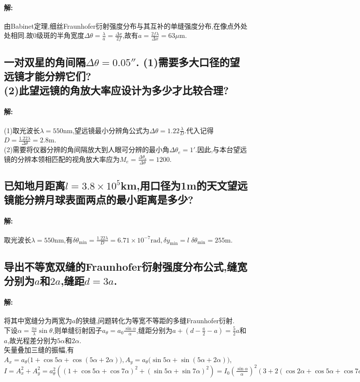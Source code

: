 \documentclass[UTF8]{article}
\newcommand{\m}{\mathrm{m}}
\newcommand{\nm}{\mathrm{nm}}
\begin{document}
    \paragraph{解: }由Babinet定理,细丝Fraunhofer衍射强度分布与其互补的单缝强度分布,在像点外处处相同.故0级斑的半角宽度$\Delta \theta=\frac{\lambda}{a}=\frac{\Delta x}{2f}$,故有$a=\frac{2f\lambda}{\Delta x}=63\mu \m$.

    \subsection{一对双星的角间隔$\Delta \theta=0.05''$. (1)需要多大口径的望远镜才能分辨它们?\\ (2)此望远镜的角放大率应设计为多少才比较合理?} %
    \paragraph{解: }(1)取光波长$\lambda=550\nm$,望远镜最小分辨角公式为$\Delta \theta=1.22\frac{\lambda}{D}$.代入记得$D=\frac{1.22\lambda}{\Delta \theta}=2.8\m$.\\ (2)需要将仪器分辨的角间隔放大到人眼可分辨的最小角$\Delta \theta_e=1'$.因此,与本台望远镜的分辨本领相匹配的视角放大率应为$M_e=\frac{\Delta \theta_e}{\Delta \theta}=1200$.

    \setcounter{subsection}{18}
    \subsection{已知地月距离$l=3.8\times 10^5$km,用口径为1m的天文望远镜能分辨月球表面两点的最小距离是多少?
    } %
    \paragraph{解: }取光波长$\lambda=550\nm$,有$\delta \theta_{\mathrm{min}}=\frac{1.22\lambda}{D}=6.71\times 10^{-7}\mathrm{rad},\delta y_{\mathrm{min}}=l\; \delta \theta_{\mathrm{min}}=255\m$.

    \setcounter{subsection}{25}
    \subsection{导出不等宽双缝的Fraunhofer衍射强度分布公式,缝宽分别为$a$和$2a$,缝距$d=3a$.} %
    \paragraph{解: }将其中宽缝分为两宽为$a$的狭缝,问题转化为等宽不等距的多缝Fraunhofer衍射.\\ 下设$\alpha=\frac{\pi a}{\lambda}\sin \theta$,则单缝衍射因子$a_\theta=a_0\frac{\sin \alpha}{\alpha}$,缝距分别为$a+\left( d-\frac{a}{2}-a \right)=\frac{5}{2}a$和$a$,故光程差分别为$5\alpha$和$2\alpha$.\\ 
    矢量叠加三缝的振幅,有$A_x=a_\theta \big( 1+\cos 5\alpha+\cos (5\alpha+2\alpha) \big),A_y=a_\theta \big( \sin 5\alpha+\sin (5\alpha+2\alpha) \big)$,\\ $I=A^2_x+A^2_y=a_\theta^2\left( \left( 1+\cos 5\alpha+\cos 7\alpha \right)^2+\left( \sin 5\alpha+\sin 7\alpha \right)^2 \right)=I_0\left( \frac{\sin \alpha}{\alpha} \right)^2\left( 3+2\left( \cos 2\alpha+\cos 5\alpha+\cos 7\alpha \right) \right).$
\end{document}
